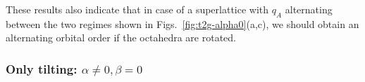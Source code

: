 \documentclass[a4paper,prb,twocolumn]{revtex4-1}  %
\newcommand{\com}[1]{}
\begin{document}
These results also indicate that in case of a superlattice with $q_A$ alternating
between the two regimes shown in Figs.~\ref{fig:t2g-alpha0}(a,c),
we should obtain an alternating orbital order if the octahedra are rotated.





\com{
$\eta=\left(\frac{a\Delta_{O}}{q_o}\right)=\frac{4}{15}$
at $D_4=1/200$\\
$a=7$ bohr, and $\braket{r^4}=11.5809$ gives $2eV$ crystal field gap: $D_4=11.5809/a^4=0.004823365264473\simeq0.005=1/200=5\times10^{-3}$,
$D_2=\sqrt{D4}=0.0694503$,
$D_2/D_4\simeq 14$.
}
\com{$D_2/D_4$ ranges between $15$-$20$ for typical gaps of $2$-$1$ eV and $a\simeq 7$ bohr (and $q_o=2e$). 
It decreases with increasing gap as $1/\sqrt(gap)$, but is still $10$ at $gap=3.5$eV.
}






\subsubsection{Only tilting: $\alpha\neq 0,\beta = 0$}
\label{sec:t2g-beta0}
\end{document}
